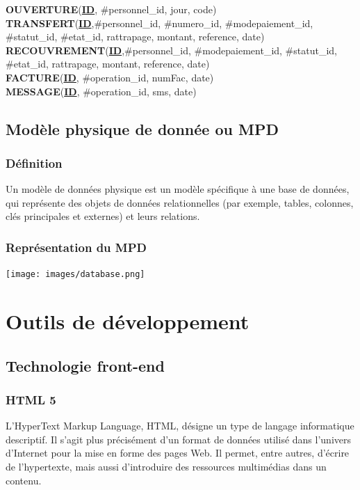 					\textbf{OUVERTURE}(\underline{\textbf{ID}}, \#personnel\_id, jour, code)\\
					
					\textbf{TRANSFERT}(\underline{\textbf{ID}},\#personnel\_id, \#numero\_id, \#modepaiement\_id, \#statut\_id, \#etat\_id, rattrapage, montant, reference, date)\\
					
					\textbf{RECOUVREMENT}(\underline{\textbf{ID}},\#personnel\_id, \#modepaiement\_id, \#statut\_id, \#etat\_id, rattrapage, montant, reference, date)\\
					
					\textbf{FACTURE}(\underline{\textbf{ID}}, \#operation\_id, numFac, date)\\
					
					\textbf{MESSAGE}(\underline{\textbf{ID}}, \#operation\_id, sms, date)\\
			\subsection{Modèle physique de donnée ou MPD}
			
				\subsubsection{Définition}
					Un modèle de données physique est un modèle spécifique à une base de données, qui représente des objets de données relationnelles (par exemple, tables, colonnes, clés principales et externes) et leurs relations.
				\subsubsection{Représentation du MPD}
					\texttt{[image: images/database.png]}
					\label{modèle physique des données}
	\section{Outils de développement}
		\subsection{Technologie front-end}
			\subsubsection{HTML 5}
				L'HyperText Markup Language, HTML, désigne un type de langage informatique descriptif. Il s'agit plus précisément d'un format de données utilisé dans l'univers d'Internet pour la mise en forme des pages Web. Il permet, entre autres, d'écrire de l'hypertexte, mais aussi d'introduire des ressources multimédias dans un contenu.\\
				
